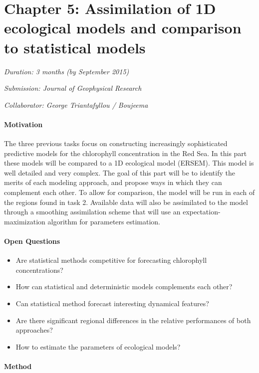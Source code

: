 \section{Chapter 5: Assimilation of 1D ecological models and comparison to statistical models}

\noindent
\emph{Duration: 3 months (by September 2015)}

\noindent
\emph{Submission: Journal of Geophysical Research}

\noindent
\emph{Collaborator: George Triantafyllou / Boujeema}

\paragraph{Motivation}

The three previous tasks focus on constructing increasingly sophisticated predictive models for the chlorophyll concentration in the Red Sea. In this part these models will be compared to a 1D ecological model (ERSEM). This model is well detailed and very complex. The goal of this part will be to identify the merits of each modeling approach, and propose ways in which they can complement each other. To allow for comparison, the model will be run in each of the regions found in task 2. Available data will also be assimilated to the model through a smoothing assimilation scheme that will use an expectation-maximization algorithm for parameters estimation. 

\paragraph{Open Questions}

\begin{itemize}
\item Are statistical methods competitive for forecasting chlorophyll concentrations?
\item How can statistical and deterministic models complements each other?
\item Can statistical method forecast interesting dynamical features?
\item Are there significant regional differences in the relative performances of both approaches?
\item How to estimate the parameters of ecological models? 
\end{itemize}

\paragraph{Method}

